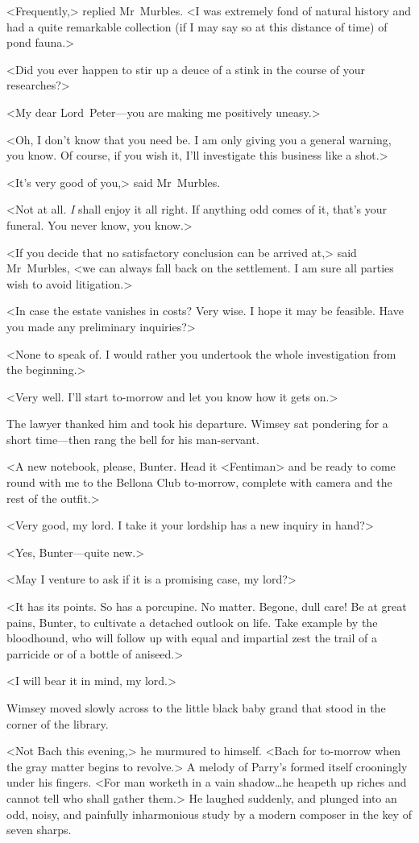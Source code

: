 <Frequently,> replied Mr~Murbles. <I was extremely fond of natural history and had a quite remarkable collection (if I may say so at this distance of time) of pond fauna.>

<Did you ever happen to stir up a deuce of a stink in the course of your researches?>

<My dear Lord~Peter—you are making me positively uneasy.>

<Oh, I don't know that you need be. I am only giving you a general warning, you know. Of course, if you wish it, I'll investigate this business like a shot.>

<It's very good of you,> said Mr~Murbles.

<Not at all. \emph{I} shall enjoy it all right. If anything odd comes of it, that's your funeral. You never know, you know.>

<If you decide that no satisfactory conclusion can be arrived at,> said Mr~Murbles, <we can always fall back on the settlement. I am sure all parties wish to avoid litigation.>

<In case the estate vanishes in costs? Very wise. I hope it may be feasible. Have you made any preliminary inquiries?>

<None to speak of. I would rather you undertook the whole investigation from the beginning.>

<Very well. I'll start to-morrow and let you know how it gets on.>

The lawyer thanked him and took his departure. Wimsey sat pondering for a short time—then rang the bell for his man-servant.

<A new notebook, please, Bunter. Head it <Fentiman> and be ready to come round with me to the Bellona Club to-morrow, complete with camera and the rest of the outfit.>

<Very good, my lord. I take it your lordship has a new inquiry in hand?>

<Yes, Bunter—quite new.>

<May I venture to ask if it is a promising case, my lord?>

<It has its points. So has a porcupine. No matter. Begone, dull care! Be at great pains, Bunter, to cultivate a detached outlook on life. Take example by the bloodhound, who will follow up with equal and impartial zest the trail of a parricide or of a bottle of aniseed.>

<I will bear it in mind, my lord.>

Wimsey moved slowly across to the little black baby grand that stood in the corner of the library.

<Not Bach this evening,> he murmured to himself. <Bach for to-morrow when the gray matter begins to revolve.> A melody of Parry's formed itself crooningly under his fingers. <For man worketh in a vain shadow\dots  he heapeth up riches and cannot tell who shall gather them.> He laughed suddenly, and plunged into an odd, noisy, and painfully inharmonious study by a modern composer in the key of seven sharps.